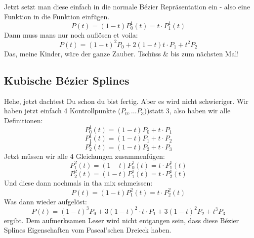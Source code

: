 Jetzt setzt man diese einfach in die normale Bézier Repräsentation ein - also eine Funktion in die Funktion einfügen.
\begin{displaymath}
P(t) = (1-t)P^1_0(t) = t\cdot P^1_1(t)
\end{displaymath}
Dann muss mans nur noch auflösen et voila:
\begin{displaymath}
P(t) = (1-t)^2P_0 + 2(1-t)t\cdot P_1+t^2P_2
\end{displaymath}
Das, meine Kinder, wäre der ganze Zauber. Tschüss \& bis zum nächsten Mal!

\subsection{Kubische Bézier Splines}
Hehe, jetzt dachtest Du schon du bist fertig. Aber es wird nicht schwieriger. Wir haben jetzt einfach 4 Kontrollpunkte (\(P_0, \dots P_3)\))statt 3, also haben wir alle Definitionen:
\begin{displaymath}
P^1_0(t) = (1-t)P_0 + t\cdot P_1
\end{displaymath}
\begin{displaymath}
P^1_1(t) = (1-t)P_1 + t\cdot P_2
\end{displaymath}
\begin{displaymath}
P^1_2(t) = (1-t)P_2 + t\cdot P_3
\end{displaymath}
Jetzt müssen wir alle 4 Gleichungen zusammenfügen:
\begin{displaymath}
P^2_1(t) = (1-t)P^1_0(t) = t\cdot P^1_1(t)
\end{displaymath}
\begin{displaymath}
P^2_2(t) = (1-t)P^1_1(t) = t\cdot P^1_2(t)
\end{displaymath}
Und diese dann nochmals in tha mix schmeissen:
\begin{displaymath}
P(t) = (1-t)P^2_1(t) = t\cdot P^2_2(t)
\end{displaymath}
Was dann wieder aufgelöst:
\begin{displaymath}
P(t) = (1-t)^3P_0+3(1-t)^2\cdot t\cdot P_1+3(1-t)^2P_2+t^3P_3
\end{displaymath}
ergibt. Dem aufmerksamen Leser wird nicht entgangen sein, dass diese Bézier Splines Eigenschaften vom Pascal'schen Dreieck haben.

